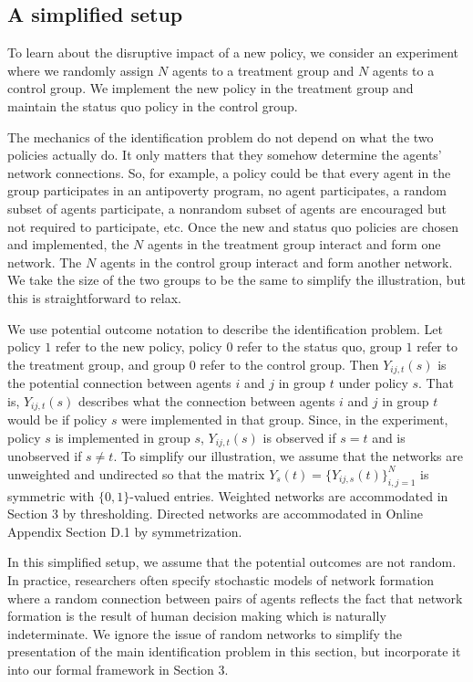 \documentclass[12pt]{article}
\theoremstyle{definition}
\begin{document}
\subsection{A simplified setup}
To learn about the disruptive impact of a new policy, we consider an experiment where we randomly assign $N$ agents to a treatment group and $N$ agents to a control group. We implement the new policy in the treatment group and maintain the status quo policy in the control group.   

The mechanics of the identification problem do not depend on what the two policies actually do. It only matters that they somehow determine the agents' network connections. So, for example, a policy could be that every agent in the group participates in an antipoverty program, no agent participates, a random subset of agents participate, a nonrandom subset of agents are encouraged but not required to participate, etc. Once the new and status quo policies are chosen and implemented,  the $N$ agents in the treatment group interact and form one network. The $N$ agents in the control group interact and form another network. We take the size of the two groups to be the same to simplify the illustration, but this is straightforward to relax.   

We use potential outcome notation to describe the identification problem. Let policy $1$ refer to the new policy, policy $0$ refer to the status quo, group $1$ refer to the treatment group, and group $0$ refer to the control group. Then $Y_{ij,t}(s)$ is the potential connection between agents $i$ and $j$ in group $t$ under policy $s$. That is, $Y_{ij,t}(s)$ describes what the connection between agents $i$ and $j$ in group $t$ would be if policy $s$ were implemented in that group. Since, in the experiment, policy $s$ is implemented in group $s$, $Y_{ij,t}(s)$ is observed if $s = t$ and is unobserved if $s \neq t$. To simplify our illustration, we assume that the networks are unweighted and undirected so that the matrix $Y_{s}(t) = \{Y_{ij,s}(t)\}_{i,j = 1}^{N}$ is symmetric with $\{0,1\}$-valued entries. Weighted networks are accommodated in Section 3 by thresholding. Directed networks are accommodated in Online Appendix Section D.1 by symmetrization.     

In this simplified setup, we assume that the potential outcomes are not random. In practice, researchers often specify stochastic models of network formation where a random connection between pairs of agents reflects the fact that network formation is the result of human decision making which is naturally indeterminate. We ignore the issue of random networks to simplify the presentation of the main identification problem in this section, but incorporate it into our formal framework in Section 3.  
\end{document}
